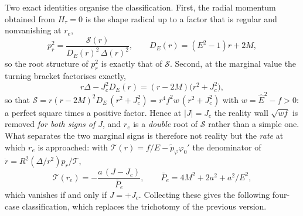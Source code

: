 \documentclass[12pt]{iopart}
\theoremstyle{plain}
\theoremstyle{definition}
\theoremstyle{remark}
\newcommand{\Ehat}{\hat E}
\newcommand{\re}{r_{e}}
\newcommand{\Jc}{J_{c}}
\begin{document}
Two exact identities organise the classification. First, the radial momentum
obtained from $H_\tau=0$ is the shape radical up to a factor that is regular and
nonvanishing at $\re$,
\begin{equation}
    p_r^2=\frac{\mathcal S(r)}{D_E(r)^2\,\Delta(r)^2},
    \qquad D_E(r)=(E^2-1)r+2M ,
    \label{eq:pr2-S}
\end{equation}
so the root structure of $p_r^2$ is exactly that of $\mathcal S$. Second, at the
marginal value the turning bracket factorises exactly,
\begin{equation}
    r\Delta-\Jc^2 D_E(r)=(r-2M)\big(r^2+\Jc^2\big),
    \label{eq:marginal-factor}
\end{equation}
so that $\mathcal S=r(r-2M)^2D_E\,(r^2+\Jc^2)=r^4f^2w\,(r^2+\Jc^2)$ with
$w=\Ehat^2-f>0$: a perfect square times a positive factor. Hence at $|J|=\Jc$
the reality wall $\sqrt{wf}$ is removed \emph{for both signs of $J$}, and $\re$
is a \emph{double} root of $\mathcal S$ rather than a simple one. What separates
the two marginal signs is therefore not reality but the \emph{rate} at which
$\re$ is approached: with
$\mathcal T(r)=f/E-\tilde p_\varphi\varphi_0'$ the denominator of
$\dot r=R^2(\Delta/r^2)p_r/\mathcal T$,
\begin{equation}
    \mathcal T(\re)=-\frac{a\,(J-\Jc)}{\bar P_e},
    \qquad \bar P_e=4M^2+2a^2+a^2/E^2 ,
    \label{eq:T-at-re}
\end{equation}
which vanishes if and only if $J=+\Jc$. Collecting these gives the following
four-case classification, which replaces the trichotomy of the previous version.
\end{document}
